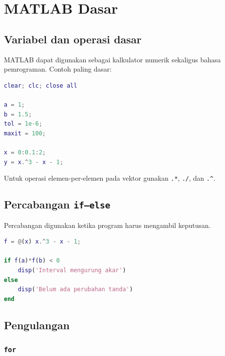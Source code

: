 \chapter{MATLAB Dasar}



\section{Variabel dan operasi dasar}

MATLAB dapat digunakan sebagai kalkulator numerik sekaligus bahasa pemrograman.
Contoh paling dasar:

\begin{lstlisting}[language=Matlab]
clear; clc; close all

a = 1;
b = 1.5;
tol = 1e-6;
maxit = 100;

x = 0:0.1:2;
y = x.^3 - x - 1;
\end{lstlisting}

Untuk operasi elemen-per-elemen pada vektor gunakan
\texttt{.*}, \texttt{./}, dan \texttt{.\^}.

\section{Percabangan \texttt{if--else}}

Percabangan digunakan ketika program harus mengambil keputusan.

\begin{lstlisting}[language=Matlab]
f = @(x) x.^3 - x - 1;

if f(a)*f(b) < 0
    disp('Interval mengurung akar')
else
    disp('Belum ada perubahan tanda')
end
\end{lstlisting}

\section{Pengulangan}

\subsection*{\texttt{for}}

